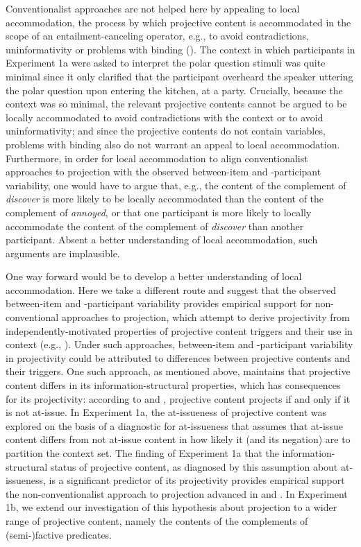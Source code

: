 \documentclass[11pt,fleqn]{article}
\newcommand{\6}{\mbox{$[\hspace*{-.6mm}[$}}
\newcommand{\9}{\mbox{$]\hspace*{-.6mm}]$}}
\begin{document}
\begin{itemize}
Conventionalist approaches are not helped here by appealing to local accommodation, the process by which projective content is accommodated in the scope of an entailment-canceling operator, e.g., to avoid contradictions, uninformativity or problems with binding (\citealt{heim83,vds92}). The context in which participants in Experiment 1a were asked to interpret the polar question stimuli was quite minimal since it only clarified that the participant overheard the speaker uttering the polar question upon entering the kitchen, at a party. Crucially, because the context was so minimal, the relevant projective contents cannot be argued to be locally accommodated to avoid contradictions with the context or to avoid uninformativity; and since the projective contents do not contain variables, problems with binding also do not warrant an appeal to local accommodation. Furthermore, in order for local accommodation to align conventionalist approaches to projection with the observed between-item and -participant variability, one would have to argue that, e.g., the content of the complement of {\em discover} is more likely to be locally accommodated than the content of the complement of {\em annoyed}, or that one participant is more likely to locally accommodate the content of the complement of {\em discover} than another participant. Absent a better understanding of local accommodation, such arguments are implausible. 

One way forward would be to develop a better understanding of local accommodation. Here we take a different route and suggest that the observed between-item and -participant variability provides empirical support for non-conventional approaches to projection, which attempt to derive projectivity from independently-motivated properties of projective content triggers and their use in context (e.g., \citealt{stalnaker74,kempson75,wilson75,boer-lycan76,levinson83,kadmon01,simons01,simons04,atlas05,abusch10,abrusan2011,best-question}). Under such approaches, between-item and -participant variability in projectivity could be attributed to differences between projective contents and their triggers. One such approach, as mentioned above, maintains that projective content differs in its information-structural properties, which has consequences for its projectivity: according to \citealt{brst-salt10} and \citealt{brst-ar}, projective content projects if and only if it is not at-issue. In Experiment 1a, the at-issueness of projective content was explored on the basis of a diagnostic for at-issueness that assumes that at-issue content differs from not at-issue content in how likely it (and its negation) are to partition the context set. The finding of Experiment 1a that the information-structural status of projective content, as diagnosed by this assumption about at-issueness, is a significant predictor of its projectivity provides empirical support the non-conventionalist approach to projection advanced in \citealt{brst-salt10} and \citealt{brst-ar}. In Experiment 1b, we extend our investigation of this hypothesis about projection to a wider range of projective content, namely the contents of the complements of (semi-)factive predicates.



\end{itemize}
\end{document}
